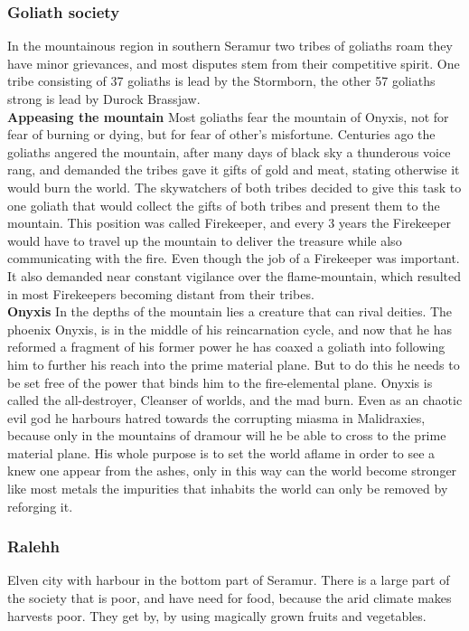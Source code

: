 \documentclass[a4paper]{article}
\begin{document}
\subsubsection{Goliath society}
In the mountainous region in southern Seramur two tribes of goliaths roam they have minor grievances, and most disputes stem from their competitive spirit. One tribe consisting of 37 goliaths is lead by the Stormborn, the other 57 goliaths strong is lead by Durock Brassjaw.
\\
\textbf{Appeasing the mountain}
Most goliaths fear the mountain of Onyxis, not for fear of burning or dying, but for fear of other's misfortune. Centuries ago the goliaths angered the mountain, after many days of black sky a thunderous voice rang, and demanded the tribes gave it gifts of gold and meat, stating otherwise it would burn the world. The skywatchers of both tribes decided to give this task to one goliath that would collect the gifts of both tribes and present them to the mountain. This position was called Firekeeper, and every 3 years the Firekeeper would have to travel up the mountain to deliver the treasure while also communicating with the fire. Even though the job of a Firekeeper was important. It also demanded near constant vigilance over the flame-mountain, which resulted in most Firekeepers becoming distant from their tribes. 
\\
\textbf{Onyxis}
In the depths of the mountain lies a creature that can rival deities. The phoenix Onyxis, is in the middle of his reincarnation cycle, and now that he has reformed a fragment of his former power he has coaxed a goliath into following him to further his reach into the prime material plane. But to do this he needs to be set free of the power that binds him to the fire-elemental plane. Onyxis is called the all-destroyer, Cleanser of worlds, and the mad burn. Even as an chaotic evil god he harbours hatred towards the corrupting miasma in Malidraxies, because only in the mountains of dramour will he be able to cross to the prime material plane. His whole purpose is to set the world aflame in order to see a knew one appear from the ashes, only in this way can the world become stronger like most metals the impurities that inhabits the world can only be removed by reforging it.


\subsubsection{Ralehh}
Elven city with harbour in the bottom part of Seramur. There is a large part of the society that is poor, and have need for food, because the arid climate makes harvests poor. They get by, by using magically grown fruits and vegetables.
\end{document}
